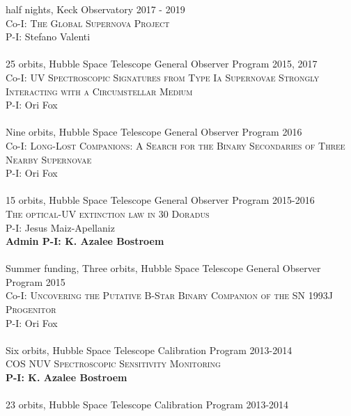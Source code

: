 \documentclass[10pt]{cv}
\begin{document}
\begin{llist}
 half nights, Keck Observatory \hfill 2017 - 2019\\
Co-I: \textsc{The Global Supernova Project}\\
P-I: Stefano Valenti \\
\\
25 orbits, Hubble Space Telescope General Observer Program \hfill 2015, 2017\\ %
Co-I: \textsc{UV Spectroscopic Signatures from Type Ia Supernovae Strongly Interacting with a Circumstellar Medium}\\
P-I: Ori Fox \\
\\
Nine orbits, Hubble Space Telescope General Observer Program \hfill 2016\\ %
Co-I: \textsc{Long-Lost Companions: A Search for the Binary Secondaries of Three Nearby Supernovae}\\
P-I: Ori Fox \\
\\
15 orbits, Hubble Space Telescope General Observer Program \hfill 2015-2016\\ %
\textsc{The optical-UV extinction law in 30 Doradus}\\
P-I: Jesus Maiz-Apellaniz \\
{\bf Admin P-I: K. Azalee Bostroem} \\
\\
Summer funding, Three orbits, Hubble Space Telescope General Observer Program \hfill 2015\\ %
Co-I: \textsc{Uncovering the Putative B-Star Binary Companion of the SN 1993J Progenitor}\\
P-I: Ori Fox \\
\\
Six orbits, Hubble Space Telescope Calibration Program \hfill 2013-2014\\ %
\textsc{COS NUV Spectroscopic Sensitivity Monitoring}\\
{\bf P-I: K. Azalee Bostroem} \\ %
\\
23 orbits, Hubble Space Telescope Calibration Program \hfill 2013-2014\\ %

\end{llist}
\end{document}
